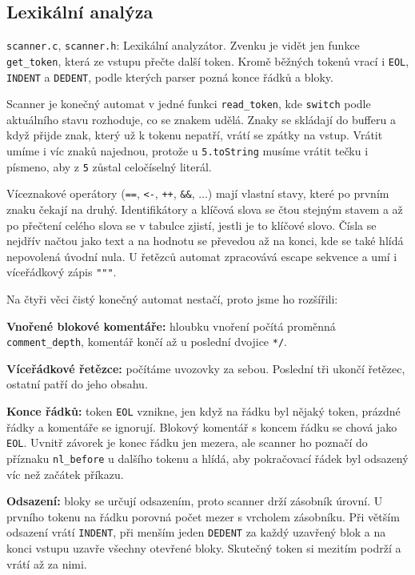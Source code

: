 \documentclass[11pt, a4paper]{article}
\begin{document}
\subsection{Lexikální analýza}

\texttt{scanner.c}, \texttt{scanner.h}: Lexikální analyzátor. Zvenku je vidět jen funkce \texttt{get\_token}, která ze vstupu přečte další token. Kromě běžných tokenů vrací i \texttt{EOL}, \texttt{INDENT} a \texttt{DEDENT}, podle kterých parser pozná konce řádků a bloky.

Scanner je konečný automat v jedné funkci \texttt{read\_token}, kde \texttt{switch} podle aktuálního stavu rozhoduje, co se znakem udělá. Znaky se skládají do bufferu a když přijde znak, který už k tokenu nepatří, vrátí se zpátky na vstup. Vrátit umíme i víc znaků najednou, protože u \texttt{5.toString} musíme vrátit tečku i písmeno, aby z \texttt{5} zůstal celočíselný literál.

Víceznakové operátory (\texttt{==}, \texttt{<-}, \texttt{++}, \texttt{\&\&}, ...) mají vlastní stavy, které po prvním znaku čekají na druhý. Identifikátory a klíčová slova se čtou stejným stavem a až po přečtení celého slova se v tabulce zjistí, jestli je to klíčové slovo. Čísla se nejdřív načtou jako text a na hodnotu se převedou až na konci, kde se také hlídá nepovolená úvodní nula. U řetězců automat zpracovává escape sekvence a umí i víceřádkový zápis \texttt{"""}.

Na čtyři věci čistý konečný automat nestačí, proto jsme ho rozšířili:

\textbf{Vnořené blokové komentáře:} hloubku vnoření počítá proměnná \texttt{comment\_depth}, komentář končí až u poslední dvojice \texttt{*/}.

\textbf{Víceřádkové řetězce:} počítáme uvozovky za sebou. Poslední tři ukončí řetězec, ostatní patří do jeho obsahu.

\textbf{Konce řádků:} token \texttt{EOL} vznikne, jen když na řádku byl nějaký token, prázdné řádky a komentáře se ignorují. Blokový komentář s koncem řádku se chová jako \texttt{EOL}. Uvnitř závorek je konec řádku jen mezera, ale scanner ho poznačí do příznaku \texttt{nl\_before} u dalšího tokenu a hlídá, aby pokračovací řádek byl odsazený víc než začátek příkazu.

\textbf{Odsazení:} bloky se určují odsazením, proto scanner drží zásobník úrovní. U prvního tokenu na řádku porovná počet mezer s vrcholem zásobníku. Při větším odsazení vrátí \texttt{INDENT}, při menším jeden \texttt{DEDENT} za každý uzavřený blok a na konci vstupu uzavře všechny otevřené bloky. Skutečný token si mezitím podrží a vrátí až za nimi.
\end{document}
